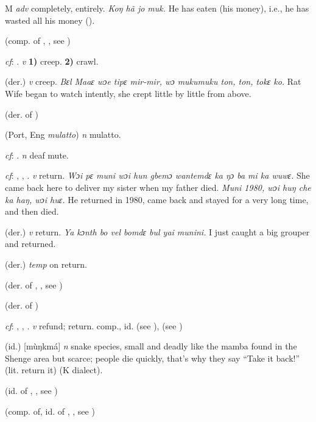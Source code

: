 \begin{letter}{M}
 \textit{adv} completely, entirely. \textit{Koŋ hã jo muk.} He has eaten (his money), i.e., he has wasted all his money (\citealt{Pichl1967}). 

 (comp. of , , see ) 

 \textit{cf}: . \textit{v} \textbf{1)} creep. \textbf{2)} crawl.

 (der.) \textit{v} creep. \textit{Bɛl Maaɛ wɔe tipɛ mir-mir, wɔ mukumuku ton, ton, tokɛ ko.} Rat Wife began to watch intently, she crept little by little from above.

 (der. of ) 

 (Port, Eng \textit{mulatto}) \textit{n} mulatto.

 \textit{cf}: . \textit{n} deaf mute.

 \textit{cf}: , , . \textit{v} return. \textit{Wɔi pɛ muni wɔi hun gbemɔ wantemdɛ ka ŋɔ ba mi ka wuwɛ.} She came back here to deliver my sister when my father died. \textit{Muni 1980, wɔi huŋ che ka haŋ, wɔi huɛ.} He returned in 1980, came back and stayed for a very long time, and then died.

 (der.) \textit{v} return. \textit{Ya kɔnth bo vel bomdɛ bul yai munini.} I just caught a big grouper and returned.

 (der.) \textit{temp} on return.

 (der. of , , see ) 

 (der. of ) 

 \textit{cf}: , , . \textit{v} refund; return. comp., id.  (see ),  (see )

 (id.) [mùŋkmá] \textit{n} snake species, small and deadly like the mamba found in the Shenge area but scarce; people die quickly, that's why they say “Take it back!” (lit. return it) (K dialect). 

 (id. of , , see ) 

 (comp. of, id. of , , see ) 


\end{letter}
